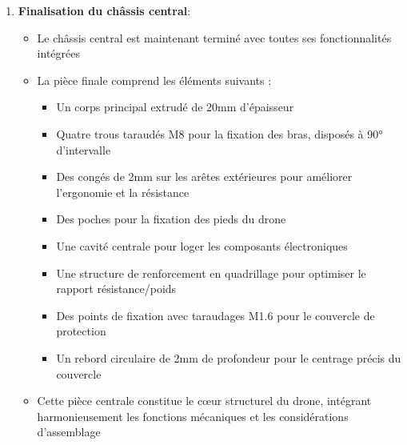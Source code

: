 \documentclass[a4paper,12pt]{report}
\begin{document}
\begin{enumerate}
    \item \textbf{Finalisation du châssis central}:
    \begin{itemize}
        \item Le châssis central est maintenant terminé avec toutes ses fonctionnalités intégrées
        \item La pièce finale comprend les éléments suivants :
        \begin{itemize}
            \item Un corps principal extrudé de 20mm d'épaisseur
            \item Quatre trous taraudés M8 pour la fixation des bras, disposés à 90° d'intervalle
            \item Des congés de 2mm sur les arêtes extérieures pour améliorer l'ergonomie et la résistance
            \item Des poches pour la fixation des pieds du drone
            \item Une cavité centrale pour loger les composants électroniques
            \item Une structure de renforcement en quadrillage pour optimiser le rapport résistance/poids
            \item Des points de fixation avec taraudages M1.6 pour le couvercle de protection
            \item Un rebord circulaire de 2mm de profondeur pour le centrage précis du couvercle
        \end{itemize}
        \item Cette pièce centrale constitue le cœur structurel du drone, intégrant harmonieusement les fonctions mécaniques et les considérations d'assemblage
    \end{itemize}
\end{enumerate}
\end{document}
